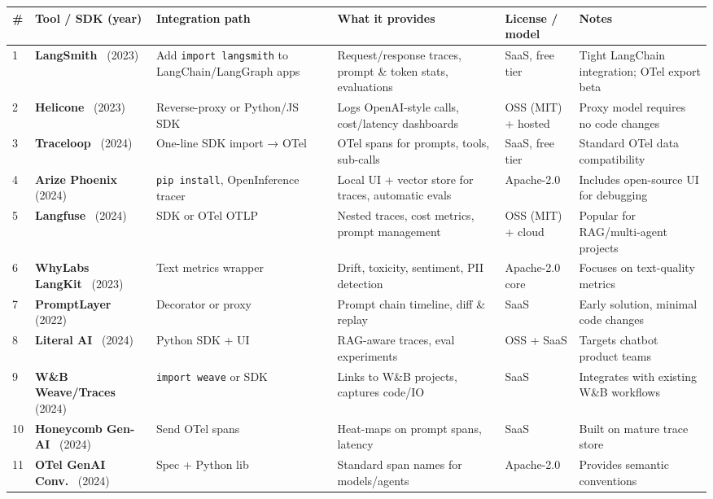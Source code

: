 \documentclass[sigplan,screen,9pt]{acmart}
\begin{document}
\begin{table*}[t]
\centering
\scriptsize
\begin{tabular}{p{0.5cm} p{2.2cm} p{2.3cm} p{2.8cm} p{1.8cm} p{2.5cm}}
\toprule
\# & Tool / SDK (year) & Integration path & What it provides & License / model & Notes \\
\midrule
1 & \textbf{LangSmith}~\cite{langsmith} (2023) & Add \texttt{import langsmith} to LangChain/LangGraph apps & Request/response traces, prompt \& token stats, evaluations & SaaS, free tier & Tight LangChain integration; OTel export beta \\
2 & \textbf{Helicone}~\cite{helicone} (2023) & Reverse-proxy or Python/JS SDK & Logs OpenAI-style calls, cost/latency dashboards & OSS (MIT) + hosted & Proxy model requires no code changes \\
3 & \textbf{Traceloop}~\cite{traceloop} (2024) & One-line SDK import → OTel & OTel spans for prompts, tools, sub-calls & SaaS, free tier & Standard OTel data compatibility \\
4 & \textbf{Arize Phoenix}~\cite{phoenix} (2024) & \texttt{pip install}, OpenInference tracer & Local UI + vector store for traces, automatic evals & Apache-2.0 & Includes open-source UI for debugging \\
5 & \textbf{Langfuse}~\cite{langfuse} (2024) & SDK or OTel OTLP & Nested traces, cost metrics, prompt management & OSS (MIT) + cloud & Popular for RAG/multi-agent projects \\
6 & \textbf{WhyLabs LangKit}~\cite{whylabs} (2023) & Text metrics wrapper & Drift, toxicity, sentiment, PII detection & Apache-2.0 core & Focuses on text-quality metrics \\
7 & \textbf{PromptLayer}~\cite{promptlayer} (2022) & Decorator or proxy & Prompt chain timeline, diff \& replay & SaaS & Early solution, minimal code changes \\
8 & \textbf{Literal AI}~\cite{literalai} (2024) & Python SDK + UI & RAG-aware traces, eval experiments & OSS + SaaS & Targets chatbot product teams \\
9 & \textbf{W\&B Weave/Traces}~\cite{wandb} (2024) & \texttt{import weave} or SDK & Links to W\&B projects, captures code/IO & SaaS & Integrates with existing W\&B workflows \\
10 & \textbf{Honeycomb Gen-AI}~\cite{honeycomb} (2024) & Send OTel spans & Heat-maps on prompt spans, latency & SaaS & Built on mature trace store \\
11 & \textbf{OTel GenAI Conv.}~\cite{otelgenai} (2024) & Spec + Python lib & Standard span names for models/agents & Apache-2.0 & Provides semantic conventions \\

\end{tabular}
\end{table*}
\end{document}
